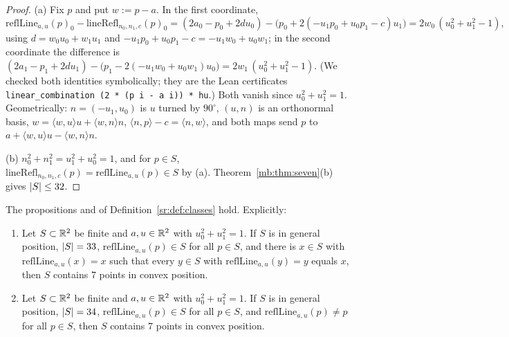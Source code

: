 \begin{proof}
(a) Fix $p$ and put $w:=p-a$. In the first coordinate,
\[
\mathrm{reflLine}_{a,u}(p)_0-\mathrm{lineRefl}_{n_0,n_1,c}(p)_0=(2a_0-p_0+2du_0)-\bigl(p_0+2(-u_1p_0+u_0p_1-c)u_1\bigr)
=2w_0\,(u_0^2+u_1^2-1),
\]
using $d=w_0u_0+w_1u_1$ and $-u_1p_0+u_0p_1-c=-u_1w_0+u_0w_1$; in the second coordinate the difference is
$(2a_1-p_1+2du_1)-\bigl(p_1-2(-u_1w_0+u_0w_1)u_0\bigr)=2w_1\,(u_0^2+u_1^2-1)$. (We checked both identities symbolically;
they are the Lean certificates \texttt{linear\_combination (2 * (p i - a i)) * hu}.) Both vanish since $u_0^2+u_1^2=1$.
Geometrically: $n=(-u_1,u_0)$ is $u$ turned by $90^\circ$, $(u,n)$ is an orthonormal basis, $w=\langle w,u\rangle u+\langle
w,n\rangle n$, $\langle n,p\rangle-c=\langle n,w\rangle$, and both maps send $p$ to $a+\langle w,u\rangle u-\langle w,n
\rangle n$.

(b) $n_0^2+n_1^2=u_1^2+u_0^2=1$, and for $p\in S$, $\mathrm{lineRefl}_{n_0,n_1,c}(p)=\mathrm{reflLine}_{a,u}(p)\in S$ by
(a). Theorem~\ref{mb:thm:seven}(b) gives $\lvert S\rvert\le32$.
\end{proof}

\begin{theorem}\label{mb:thm:classes}\raggedright
The propositions  and  of Definition~\ref{sr:def:classes} hold. Explicitly:
\begin{enumerate}[label=(\alph*)]
\item Let $S\subset\mathbb R^2$ be finite and $a,u\in\mathbb R^2$ with $u_0^2+u_1^2=1$. If $S$ is in general position, $\lvert S\rvert=33$,
  $\mathrm{reflLine}_{a,u}(p)\in S$ for all $p\in S$, and there is $x\in S$ with $\mathrm{reflLine}_{a,u}(x)=x$ such that
  every $y\in S$ with $\mathrm{reflLine}_{a,u}(y)=y$ equals $x$, then $S$ contains $7$ points in convex position.
\item Let $S\subset\mathbb R^2$ be finite and $a,u\in\mathbb R^2$ with $u_0^2+u_1^2=1$. If $S$ is in general position, $\lvert S\rvert=34$,
  $\mathrm{reflLine}_{a,u}(p)\in S$ for all $p\in S$, and $\mathrm{reflLine}_{a,u}(p)\ne p$ for all $p\in S$, then $S$
  contains $7$ points in convex position.
\end{enumerate}
\end{theorem}

